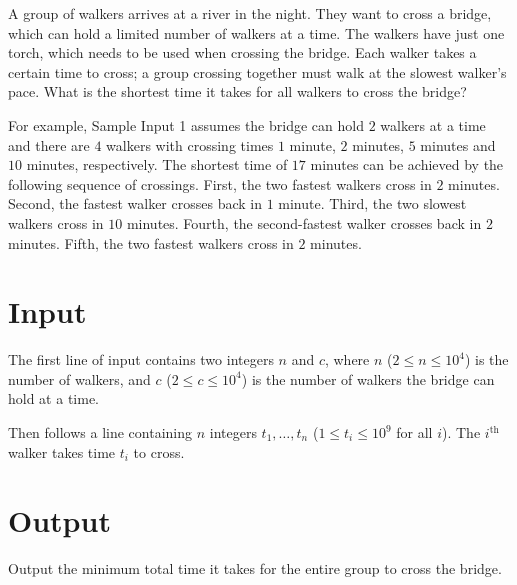 
%
A group of walkers arrives at a river in the night.
They want to cross a bridge, which can hold a limited number of walkers at a time.
The walkers have just one torch, which needs to be used when crossing the bridge.
Each walker takes a certain time to cross; a group crossing together must walk at the slowest walker's pace.
What is the shortest time it takes for all walkers to cross the bridge?

For example, Sample Input 1 assumes the bridge can hold $2$ walkers at a time and there are $4$ walkers with crossing times $1$ minute, $2$ minutes, $5$ minutes and $10$ minutes, respectively.
The shortest time of $17$ minutes can be achieved by the following sequence of crossings.
First, the two fastest walkers cross in $2$ minutes.
Second, the fastest walker crosses back in $1$ minute.
Third, the two slowest walkers cross in $10$ minutes.
Fourth, the second-fastest walker crosses back in $2$ minutes.
Fifth, the two fastest walkers cross in $2$ minutes.

\section*{Input}

The first line of input contains two integers $n$ and $c$, where $n$ ($2 \leq n \leq 10^4$) is the number of walkers, and $c$ ($2 \leq c \leq 10^4$) is the number of walkers the bridge can hold at a time.

Then follows a line containing $n$ integers $t_1, \ldots, t_n$ ($1 \leq t_i \leq 10^9$ for all $i$).
The $i^{\text{th}}$ walker takes time $t_i$ to cross.

\section*{Output}

Output the minimum total time it takes for the entire group to cross the bridge.


